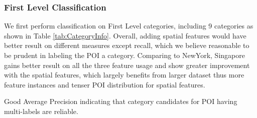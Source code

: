 \subsubsection{First Level Classification}
We first perform classification on First Level categories, including 9 categories as shown in Table \ref{tab:CategoryInfo}. Overall, adding spatial features would have better result on different measures except recall, which we believe reasonable to be prudent in labeling the POI a category. Comparing to NewYork, Singapore gains better result on all the three feature usage and show greater improvement with the spatial features, which largely benefits from larger dataset thus more feature instances and tenser POI distribution for spatial features.

 Good Average Precision indicating that category candidates for POI having multi-labels are reliable.


